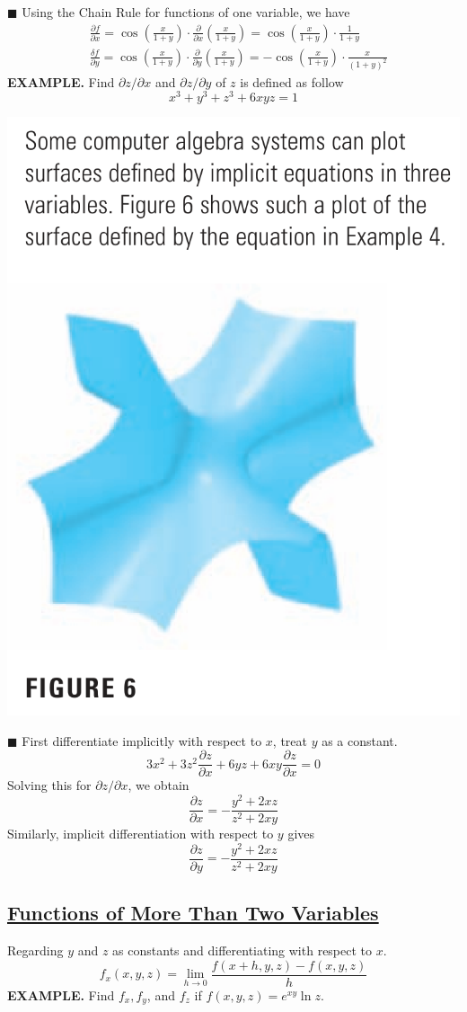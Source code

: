 \documentclass{article}
\begin{document}
\textcolor{blue5}{\small $ \blacksquare$} Using the Chain Rule for functions of one variable, we have 
\begin{equation*}
  \begin{split}
    & \frac{\partial f }{\partial x } = \cos{\left( \frac{x }{ 1 + y }  \right)} \cdot \frac{\partial}{\partial x } \left( \frac{x }{1 + y }  \right) = \cos{ \left( \frac{x }{1 + y }\right)} \cdot \frac{1 }{1 + y } \\ 
    & \frac{\delta f }{\partial y } = \cos{\left( \frac{x }{ 1 + y }  \right)} \cdot \frac{\partial }{\partial y } \left( \frac{x }{1 + y }  \right) = -  \cos{ \left( \frac{x }{1 + y }\right)} \cdot \frac{x }{(1 + y)^2 } 
  \end{split}
\end{equation*}
{\selectfont \textbf{\textcolor{blue5}{{\small {}} EXAMPLE.}}} Find $\partial z / \partial x $ and $ \partial z / \partial y $ of $z $ is defined as follow 
\[x ^ 3 + y ^ 3 + z ^ 3 + 6 xyz = 1 \]


\begin{minipage}[b]{0.28\linewidth}
  \includegraphics[width = 4.3 cm]{./images/partialeg4.png}
  \end{minipage}
\begin{minipage}[b]{0.67\linewidth}
\textcolor{blue9}{\small $\blacksquare$} First differentiate implicitly with respect to $x $, treat $y $ as a constant.
\[3 x^2 + 3 z^2 \frac{\partial z }{ \partial x } + 6yz + 6xy \frac{\partial z }{ \partial x }= 0\]
Solving this for $\partial z / \partial x $, we obtain 
\[ \frac{\partial z }{\partial x } = - \frac{y^2 + 2xz }{z^2 + 2xy }\]
Similarly, implicit differentiation with respect to $y $ gives 
\[\frac{\partial z }{\partial y } = - \frac{y^2 + 2xz }{z^2 + 2xy }\]
\end{minipage}

\subsection*{{\selectfont \underline{Functions of More Than Two Variables }}}  
Regarding $y$ and $z$ as constants and differentiating with respect to $x$.
\[f_x (x, y, z) = \lim_{h \to 0 } \frac{f(x + h, y, z) - f(x,y,z)}{h }\]
{\selectfont \textbf{\textcolor{blue5}{{\small {}} EXAMPLE.}}}  Find $f_x, f _ y $, and $f _ z $ if $f(x,y,z) = e^{xy} \ln{z}$.
\end{document}
